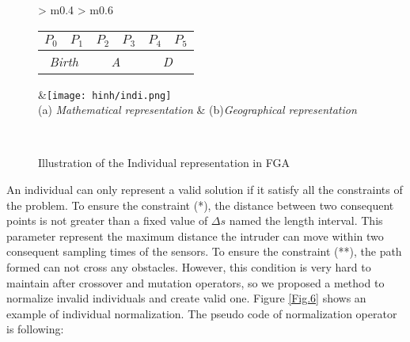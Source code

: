 \documentclass[final]{elsarticle}
\begin{document}
\begin{figure*}[h]
	\renewcommand{\arraystretch}{1.5}
	\centering
	\begin{tabular}{ >{\centering\arraybackslash} m{0.4\linewidth} >{\centering\arraybackslash} m{0.6\linewidth} }
		\begin{tabular}{|c|c|c|c|c|c|}
			\hline 
			$P_0$ & $P_1$ & $P_2$ & $P_3$ & $P_4$ & $P_5$  \\
			\hline 
			\multicolumn{2}{|c|}{\textit{Birth}} & \multicolumn{2}{c|}{\textit{A}}  & \multicolumn{2}{c|}{\textit{D}}  \\
			\hline
		\end{tabular} &\texttt{[image: hinh/indi.png]} \\
		(a) \textit{Mathematical representation} & (b)\textit{Geographical representation} \\
	\end{tabular}
	\\
	\caption{Illustration of the Individual representation in FGA
	}
	\label{Fig.4}       %
\end{figure*}

An individual can only represent a valid solution if it satisfy all the constraints of the problem. To ensure the constraint (*), the distance between two consequent points is not greater than a fixed value of $\Delta s$ named the length interval. This parameter represent the maximum distance the intruder can move within two consequent sampling times of the sensors. To ensure the constraint (**), the path formed can not cross any obstacles. However, this condition is very hard to maintain after crossover and mutation operators, so we proposed a method to normalize invalid individuals and create valid one. Figure \ref{Fig.6} shows an example of individual normalization. The pseudo code of normalization operator is following:
\end{document}
